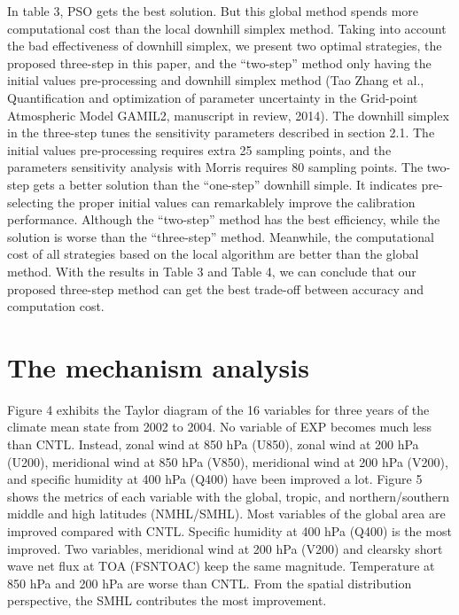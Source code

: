 \documentclass[gmd, manuscript]{copernicus}
\begin{document}
In table 3, PSO gets the best solution. But this global method spends more computational cost than the local downhill simplex method. Taking into account the bad effectiveness of downhill simplex, we present two optimal strategies, the proposed three-step in this paper, and the ``two-step'' method only having the initial values pre-processing and downhill simplex method (Tao Zhang et al., Quantification and optimization of parameter uncertainty in the Grid-point Atmospheric Model GAMIL2, manuscript in review, 2014). The downhill simplex in the three-step tunes the sensitivity parameters described in section 2.1. The initial values pre-processing requires extra 25 sampling points, and the parameters sensitivity analysis with Morris requires 80 sampling points. The two-step gets a better solution than the ``one-step'' downhill simple. It indicates pre-selecting the proper initial values can remarkablely improve the calibration performance. Although the ``two-step'' method has the best efficiency, while the solution is worse than the ``three-step'' method. Meanwhile, the computational cost of all strategies based on the local algorithm are better than the global method. With the results in Table 3 and Table 4, we can conclude that our proposed three-step method can get the best trade-off between accuracy and computation cost.   




\section{The mechanism analysis}

Figure 4 exhibits the Taylor diagram of the 16 variables for three years of the climate mean state from 2002 to 2004.  No variable of EXP becomes much less than CNTL. Instead,  zonal wind at 850 hPa (U850),  zonal wind at 200 hPa (U200), meridional wind at 850 hPa (V850), meridional wind at 200 hPa (V200), and specific humidity at 400 hPa (Q400) have been improved a lot. Figure 5 shows the metrics of each variable with the global, tropic, and northern/southern middle and high latitudes (NMHL/SMHL). Most variables of the global area are improved compared with CNTL. Specific humidity at 400 hPa (Q400) is the most improved. Two variables, meridional wind at 200 hPa (V200) and clearsky short wave net flux at TOA (FSNTOAC) keep the same magnitude. Temperature  at 850 hPa and 200 hPa are worse than CNTL. From the spatial distribution perspective, the SMHL contributes the most improvement.
\end{document}
